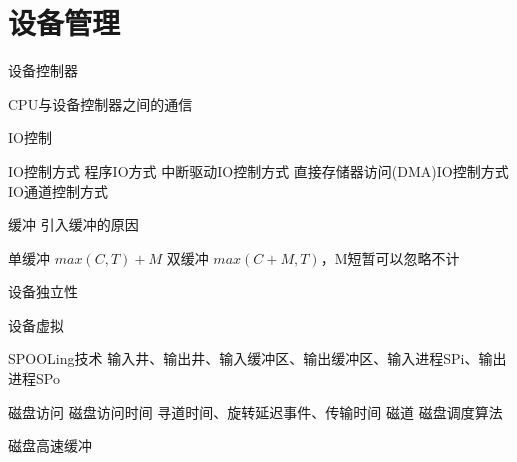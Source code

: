 \chapter{设备管理}

设备控制器

CPU与设备控制器之间的通信

IO控制

IO控制方式
程序IO方式
中断驱动IO控制方式
直接存储器访问(DMA)IO控制方式
IO通道控制方式

缓冲
引入缓冲的原因

单缓冲 $max(C,T)+M$
双缓冲 $max(C+M,T)$，M短暂可以忽略不计

设备独立性

设备虚拟

SPOOLing技术
输入井、输出井、输入缓冲区、输出缓冲区、输入进程SPi、输出进程SPo

磁盘访问 
磁盘访问时间 寻道时间、旋转延迟事件、传输时间
磁道
磁盘调度算法

磁盘高速缓冲


 
